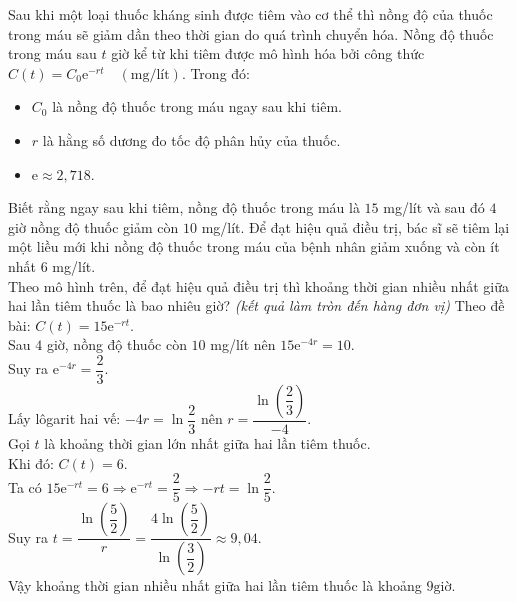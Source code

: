 \begin{ex}%
	Sau khi một loại thuốc kháng sinh được tiêm vào cơ thể thì nồng độ của thuốc trong máu sẽ giảm dần theo thời gian do quá trình chuyển hóa. Nồng độ thuốc trong máu sau $t$ giờ kể từ khi tiêm được mô hình hóa bởi công thức $C(t)=C_0\mathrm{e}^{-rt}\quad (\text{mg/lít})$. Trong đó:
	\begin{itemize}
	\item $C_0$ là nồng độ thuốc trong máu ngay sau khi tiêm.
	\item $r$ là hằng số dương đo tốc độ phân hủy của thuốc.
	\item $\mathrm{e}\approx 2{,}718$.
	\end{itemize}
	Biết rằng ngay sau khi tiêm, nồng độ thuốc trong máu là $15$ mg/lít và sau đó $4$ giờ nồng độ thuốc giảm còn $10$ mg/lít. Để đạt hiệu quả điều trị, bác sĩ sẽ tiêm lại một liều mới khi nồng độ thuốc trong máu của bệnh nhân giảm xuống và còn ít nhất $6$ mg/lít.\\
	Theo mô hình trên, để đạt hiệu quả điều trị thì khoảng thời gian nhiều nhất giữa hai lần tiêm thuốc là bao nhiêu giờ? \textit{(kết quả làm tròn đến hàng đơn vị)}
	\loigiai
	{
	Theo đề bài: $C(t)=15\mathrm{e}^{-rt}$.\\
	Sau $4$ giờ, nồng độ thuốc còn $10$ mg/lít nên $15\mathrm{e}^{-4r}=10$.\\
	Suy ra $\mathrm{e}^{-4r}=\dfrac{2}{3}$.\\
	Lấy lôgarit hai vế: $-4r=\ln\dfrac{2}{3}$ 
	nên $r=\dfrac{\ln \left( \dfrac{2}{3}\right)}{-4}$.\\
	Gọi $t$ là khoảng thời gian lớn nhất giữa hai lần tiêm thuốc. \\
	Khi đó: $C(t)=6$.\\
	Ta có $15\mathrm{e}^{-rt}=6 \Rightarrow \mathrm{e}^{-rt}=\dfrac{2}{5} \Rightarrow -rt=\ln\dfrac{2}{5}$.\\
	Suy ra $t=\dfrac{\ln\left( \dfrac{5}{2}\right)}{r}=	\dfrac{4\ln\left( \dfrac{5}{2}\right)}{\ln\left( \dfrac{3}{2}\right)} \approx 9{,}04$.\\
	Vậy khoảng thời gian nhiều nhất giữa hai lần tiêm thuốc là khoảng $9\text{giờ}$.
	}
\end{ex}

